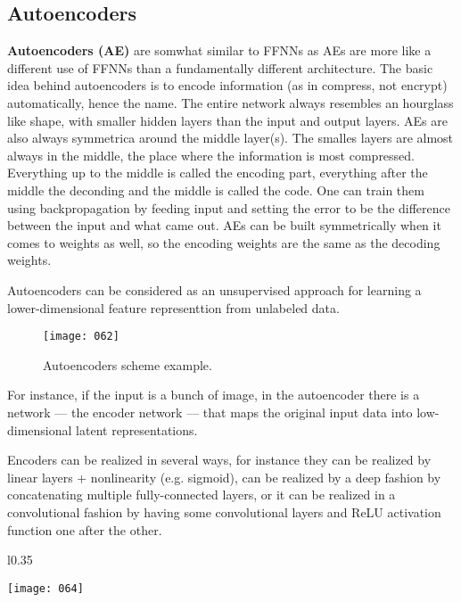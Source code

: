 \subsection{Autoencoders}
\textbf{Autoencoders (AE)} are somwhat similar to FFNNs as AEs are more like a different use of FFNNs than a fundamentally different architecture. The basic idea behind autoencoders is to encode information (as in compress, not encrypt) automatically, hence the name. The entire network always resembles an hourglass like shape, with smaller hidden layers than the input and output layers. AEs are also always symmetrica around the middle layer(s). The smalles layers are almost always in the middle, the place where the information is most compressed. Everything up to the middle is called the encoding part, everything after the middle the deconding and the middle is called the code. One can train them using backpropagation by feeding input and setting the error to be the difference between the input and what came out. AEs can be built symmetrically when it comes to weights as well, so the encoding weights are the same as the decoding weights.

Autoencoders can be considered as an unsupervised approach for learning a lower-dimensional feature representtion from unlabeled data.

\begin{figure}[h!]
    \centering
    \texttt{[image: 062]}
    \caption{Autoencoders scheme example.}
    \label{fig:062}
\end{figure}

For instance, if the input is a bunch of image, in the autoencoder there is a network --- the encoder network --- that maps the original input data into low-dimensional latent representations.

Encoders can be realized in several ways, for instance they can be realized by linear layers + nonlinearity (e.g. sigmoid), can be realized by a deep fashion by concatenating multiple fully-connected layers, or it can be realized in a convolutional fashion by having some convolutional layers and ReLU activation function one after the other.

\begin{wrapfigure}{l}{0.35\textwidth}
    \begin{center}
        \texttt{[image: 064]}
        \caption{}
    \end{center}
    \label{fig:064}
\end{wrapfigure}

